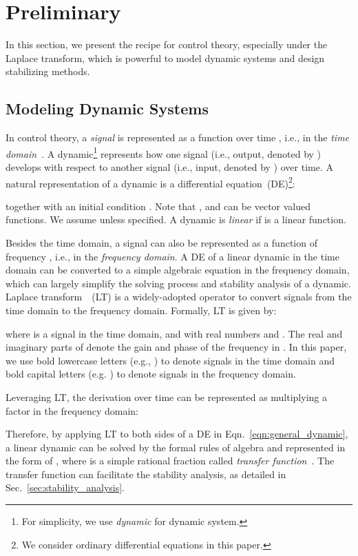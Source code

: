 \documentclass{article}
\newcommand{\eqn}[1]{Eqn.~\eqref{eqn:#1}}
\newcommand{\secref}[1]{Sec.~\ref{sec:#1}} \usepackage{wrapfig}
\theoremstyle{definition}
\begin{document}
\section{Preliminary}
\label{sec:preliminary}


In this section, we present the recipe for control theory, especially under the Laplace transform, which is powerful to model dynamic systems and design stabilizing methods.

\subsection{Modeling Dynamic Systems }
\label{sec:dynamicmodeling}


In control theory, a {\it signal} is represented as a function over time , i.e., in the {\it time domain}~\cite{kailath1980linear}. 
A dynamic\footnote{For simplicity, we use {\it dynamic} for dynamic system.} represents how one signal (i.e., output, denoted by ) develops with respect to another signal (i.e., input, denoted by ) over time. A natural representation of a dynamic is a differential equation~(DE)\footnote{We consider ordinary differential equations in this paper.}:

together with an initial condition .
Note that ,  and  can be vector valued functions. 
We assume  unless specified.
A dynamic is {\it linear} if  is a linear function.




Besides the time domain, a signal can also be represented as a function of frequency , i.e., in the {\it frequency domain}.
A DE of a linear dynamic in the time domain can be converted to a simple algebraic equation in the frequency domain, which can largely simplify the solving process and stability analysis of a dynamic. Laplace transform~\cite{widder2015laplace}~(LT) is a widely-adopted operator to convert signals from the time domain to the frequency domain. Formally, LT is given by:

where  is a signal in the time domain, and  with real numbers  and . The real and imaginary parts of  denote the gain and phase of the frequency  in . In this paper, we use bold lowercase letters (e.g., ) to denote signals in the time domain and bold capital letters (e.g. ) to denote signals in the frequency domain.

Leveraging LT, the derivation over time  can be represented as multiplying a factor  in the frequency domain:

Therefore, by applying LT to both sides of a DE in \eqn{general_dynamic}, a linear dynamic can be solved by the formal rules of algebra and represented in the form of , where  is a simple rational fraction called {\it transfer function}~\cite{kailath1980linear}.
The transfer function can facilitate the stability analysis, as detailed in \secref{stability_analysis}.
\end{document}

